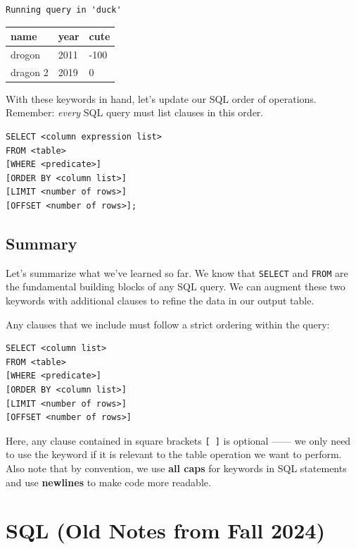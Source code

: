 \documentclass[
  letterpaper,
  DIV=11,
  numbers=noendperiod]{scrreprt}
\begin{document}
\begin{verbatim}
Running query in 'duck'
\end{verbatim}

\begin{longtable}[]{@{}lll@{}}
\toprule\noalign{}
name & year & cute \\
\midrule\noalign{}
\endhead
\bottomrule\noalign{}
\endlastfoot
drogon & 2011 & -100 \\
dragon 2 & 2019 & 0 \\
\end{longtable}

With these keywords in hand, let's update our SQL order of operations.
Remember: \emph{every} SQL query must list clauses in this order.

\begin{verbatim}
SELECT <column expression list>
FROM <table>
[WHERE <predicate>]
[ORDER BY <column list>]
[LIMIT <number of rows>]
[OFFSET <number of rows>];
\end{verbatim}

\section{Summary}\label{summary-3}

Let's summarize what we've learned so far. We know that \texttt{SELECT}
and \texttt{FROM} are the fundamental building blocks of any SQL query.
We can augment these two keywords with additional clauses to refine the
data in our output table.

Any clauses that we include must follow a strict ordering within the
query:

\begin{verbatim}
SELECT <column list>
FROM <table>
[WHERE <predicate>]
[ORDER BY <column list>]
[LIMIT <number of rows>]
[OFFSET <number of rows>]
\end{verbatim}

Here, any clause contained in square brackets \texttt{{[}\ {]}} is
optional ------ we only need to use the keyword if it is relevant to the
table operation we want to perform. Also note that by convention, we use
\textbf{all caps} for keywords in SQL statements and use
\textbf{newlines} to make code more readable.


\chapter{SQL (Old Notes from Fall
2024)}\label{sql-old-notes-from-fall-2024}
\end{document}

